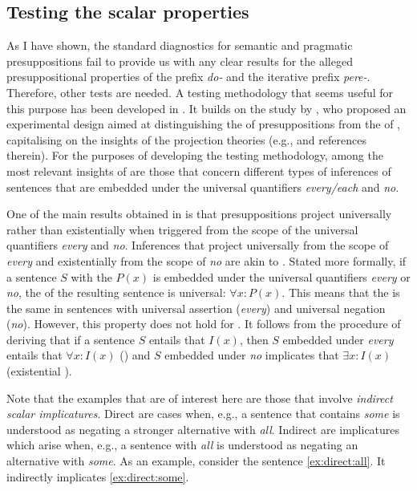 \subsection{Testing the scalar properties}\label{sec:chemla}
As I have shown, the standard diagnostics for semantic and pragmatic presuppositions fail to provide us with any clear results for the alleged presuppositional properties of the  prefix \textit{do-} and the iterative prefix \textit{pere-}. Therefore, other tests are needed. A testing methodology that seems useful for this purpose has been developed in \citealt{ZinovaFilip:SALT}. It builds on the study by \citet{Chemla:09}, who proposed an experimental design aimed at distinguishing the  of presuppositions from the  of , capitalising on the insights of the  projection theories (e.g., \citealp{Heim:83, Schlenker:08} and references therein). For the purposes of developing the testing methodology, among the most relevant insights of \citet{Chemla:09} are those that concern different types of inferences of sentences that are embedded under the universal quantifiers \textit{every/each} and \textit{no}.

One of the main results obtained in \citealt{Chemla:09} is that presuppositions project universally rather than existentially when triggered from the scope of the universal quantifiers \textit{every} and \textit{no}. Inferences that project universally from the scope of \textit{every} and existentially from the scope of \textit{no} are akin to . Stated more formally, if a sentence $S$ with the  $P(x)$ is embedded under the universal quantifiers \textit{every} or \textit{no}, the  of the resulting sentence is universal: $\forall x: P(x)$. This means that the  is the same in sentences with universal assertion (\textit{every}) and universal negation (\textit{no}). However, this property does not hold for . It follows from the procedure of deriving  that if a sentence $S$ entails that $I(x)$, then $S$ embedded under \textit{every} entails that $\forall x: I(x)$ () and $S$ embedded under \textit{no} implicates that $\exists x: I(x)$ (existential ).

Note that the examples that are of interest here are those that involve \textit{indirect scalar implicatures}. Direct  are cases when, e.g., a sentence that contains \textit{some} is understood as negating a stronger alternative with \textit{all}. Indirect  are implicatures which arise when, e.g., a sentence with \textit{all} is understood as negating an alternative with \textit{some}. As an example, consider the sentence \ref{ex:direct:all}. It indirectly implicates \ref{ex:direct:some}.

